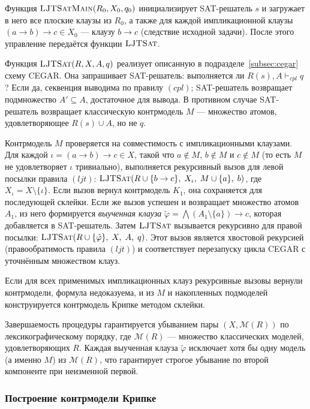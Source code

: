 \documentclass[14pt, russian]{scrartcl}
\begin{document}
Функция $\textsc{LJTSatMain}(R_0, X_0, q_0)$ инициализирует SAT-решатель $s$
и загружает в него все плоские клаузы из $R_0$, а также для каждой
импликационной клаузы $(a \to b) \to c \in X_0$ --- клаузу $b \to c$
(следствие исходной задачи). После этого управление передаётся функции
$\textsc{LJTSat}$.

Функция $\textsc{LJTSat}(R, X, A, q)$ реализует описанную в
подразделе~\ref{subsec:cegar} схему CEGAR. Она запрашивает SAT-решатель:
выполняется ли $R(s), A \vdash_{\mathit{cpl}} q$? Если да, секвенция выводима по
правилу $(cpl)$; SAT-решатель возвращает подмножество $A' \subseteq A$,
достаточное для вывода. В противном случае SAT-решатель возвращает классическую
контрмодель $M$ --- множество атомов, удовлетворяющее $R(s) \cup A$, но не $q$.

Контрмодель $M$ проверяется на совместимость с импликационными клаузами.
Для каждой $\iota = (a \to b) \to c \in X$, такой что $a \notin M$,
$b \notin M$ и $c \notin M$ (то есть $M$ не удовлетворяет $\iota$ тривиально),
выполняется рекурсивный вызов для левой посылки правила $(ljt)$:
$\textsc{LJTSat}(R \cup \{b \to c\},\; X_\iota,\; M \cup \{a\},\; b)$, где
$X_\iota = X \setminus \{\iota\}$. Если вызов вернул контрмодель $K_1$, она
сохраняется для последующей склейки. Если же вызов успешен и возвращает множество
атомов $A_1$, из него формируется \emph{выученная клауза}
$\tilde{\varphi} = \bigwedge(A_1 \setminus \{a\}) \to c$, которая добавляется в
SAT-решатель. Затем $\textsc{LJTSat}$ вызывается рекурсивно для правой посылки:
$\textsc{LJTSat}(R \cup \{\tilde{\varphi}\},\; X,\; A,\; q)$. Этот вызов
является хвостовой рекурсией (правообратимость правила $(ljt)$) и соответствует
перезапуску цикла CEGAR с уточнённым множеством клауз.

Если для всех применимых импликационных клауз рекурсивные вызовы вернули
контрмодели, формула недоказуема, и из $M$ и накопленных подмоделей
конструируется контрмодель Крипке методом склейки.

Завершаемость процедуры гарантируется убыванием пары $(X, \mathcal{M}(R))$
по лексикографическому порядку, где $\mathcal{M}(R)$ --- множество классических
моделей, удовлетворяющих $R$. Каждая выученная клауза $\tilde{\varphi}$
исключает хотя бы одну модель (а именно $M$) из $\mathcal{M}(R)$, что
гарантирует строгое убывание по второй компоненте при неизменной первой.

\subsubsection{Построение контрмодели Крипке}
\end{document}
